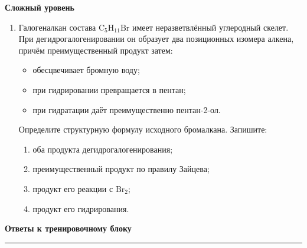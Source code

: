 \documentclass[a4paper,12pt]{article}
\newcommand{\topic}[1]{%
    \vspace{0.5em}
    {\Large\bfseries\textcolor{darkaccent}{#1}}\par
    \vspace{0.25em}
    {\color{accent}\rule{\linewidth}{0.7pt}}
    \vspace{0.4em}
}
\newcommand{\subtopic}[1]{%
    \vspace{0.35em}
    {\large\bfseries\textcolor{accent}{#1}}\par
}
\begin{document}
\subtopic{Сложный уровень}

\begin{enumerate}[resume]

\item Галогеналкан состава \(\mathrm{C_5H_{11}Br}\) имеет неразветвлённый углеродный скелет. При дегидрогалогенировании он образует два позиционных изомера алкена, причём преимущественный продукт затем:

\begin{itemize}
    \item обесцвечивает бромную воду;
    \item при гидрировании превращается в пентан;
    \item при гидратации даёт преимущественно пентан-2-ол.
\end{itemize}

Определите структурную формулу исходного бромалкана. Запишите:

\begin{enumerate}[label=\alph*)]
    \item оба продукта дегидрогалогенирования;
    \item преимущественный продукт по правилу Зайцева;
    \item продукт его реакции с \(\mathrm{Br_2}\);
    \item продукт его гидрирования.
\end{enumerate}

\end{enumerate}


\clearpage
\thispagestyle{fancy}

\topic{Ответы к тренировочному блоку}

\renewcommand{\arraystretch}{1.45}
\end{document}
